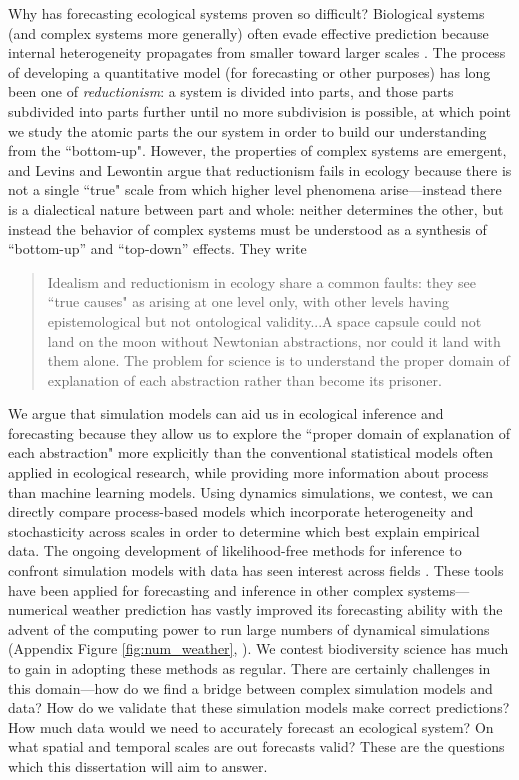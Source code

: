 \documentclass[]{article}
\begin{document}
Why has forecasting ecological systems proven so difficult? 
Biological systems (and complex systems more generally) often evade effective prediction because internal heterogeneity propagates from smaller toward larger scales \citep{levins_dialectical_1987,levin_problem_1992}. The process of developing a quantitative model (for forecasting or other purposes) has long been one of \textit{reductionism}: a system is divided into parts, and those parts subdivided into parts further until no more subdivision is possible, at which point we study the atomic parts the our system in order to build our understanding from the ``bottom-up". However, the properties of complex systems are emergent, and
Levins and Lewontin \cite{levins_dialectical_1987} argue that reductionism fails in ecology because there is not a single ``true" scale from which higher level phenomena arise---instead there is a dialectical nature between part and whole: neither determines the other, but instead the behavior of complex systems must be understood as a synthesis of ``bottom-up'' and ``top-down'' effects. They write 

\begin{quote}
Idealism and reductionism in ecology share a common faults: they see ``true causes" as arising at one level only, with other levels having epistemological but not ontological validity...A space capsule could not land on the moon without Newtonian abstractions, nor could it land with them alone. The problem for science
is to understand the proper domain of explanation of each abstraction
rather than become its prisoner. \citep{levin_problem_1992}
\end{quote}

We argue that simulation models can aid us in ecological inference and forecasting because they allow us to explore the ``proper domain of explanation of each abstraction" more explicitly than the conventional statistical models often applied in ecological research, while providing more information about process than machine learning models. Using dynamics simulations, we contest, we can directly compare process-based models which incorporate heterogeneity and stochasticity across scales in order to determine which best explain empirical data. The ongoing development of likelihood-free methods for inference to confront simulation models with data has seen interest across fields \cite{alsing_massive_2018, didelot_likelihood-free_2011, drovandi_likelihood-free_2011,orbanz_bayesian_2015}. These tools have been applied for forecasting and inference in other complex systems---numerical weather prediction has vastly improved its forecasting ability with the advent of the computing power to run large numbers of dynamical simulations (Appendix Figure \ref{fig:num_weather},  \cite{numerical_weather}). We contest biodiversity science has much to gain in adopting these methods as regular. There are certainly challenges in this domain---how do we find a bridge between complex simulation models and data? How do we validate that these simulation models make  correct predictions?
How much data would we need to accurately forecast an ecological system? On what spatial and temporal scales are out forecasts valid? 
These are the questions which this dissertation will aim to answer.
\end{document}
